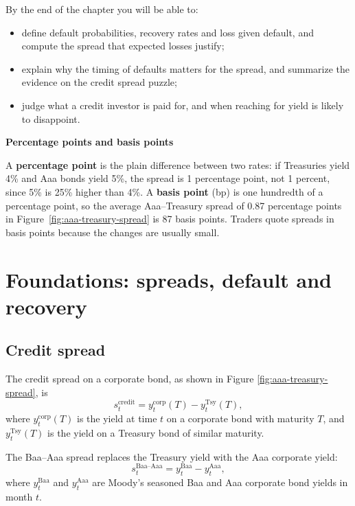 By the end of the chapter you will be able to:

\begin{itemize}
  \item define default probabilities, recovery rates and loss given default, and compute the spread that expected losses justify;
  \item explain why the timing of defaults matters for the spread, and summarize the evidence on the credit spread puzzle;
  \item judge what a credit investor is paid for, and when reaching for yield is likely to disappoint.
\end{itemize}

\begin{callout}{\textbf{Percentage points and basis points}}

A \textbf{percentage point} is the plain difference between two rates: if Treasuries yield 4\% and Aaa bonds yield 5\%, the spread is 1 percentage point, not 1 percent, since 5\% is 25\% higher than 4\%. A \textbf{basis point} (bp) is one hundredth of a percentage point, so the average Aaa--Treasury spread of 0.87 percentage points in Figure~\ref{fig:aaa-treasury-spread} is 87 basis points. Traders quote spreads in basis points because the changes are usually small.
\end{callout}

\section{Foundations: spreads, default and recovery}
\label{sec:15-foundations}

\subsection{Credit spread}

The credit spread on a corporate bond, as shown in Figure \ref{fig:aaa-treasury-spread}, is
\begin{equation}
  s_t^{\text{credit}} = y_t^{\text{corp}}(T) - y_t^{\text{Tsy}}(T),
  \label{eq:credit-spread}
\end{equation}
where $y_t^{\text{corp}}(T)$ is the yield at time $t$ on a corporate bond with maturity $T$, and $y_t^{\text{Tsy}}(T)$ is the yield on a Treasury bond of similar maturity.

The Baa--Aaa spread replaces the Treasury yield with the Aaa corporate yield:
\begin{equation}
  s_t^{\text{Baa--Aaa}} = y_t^{\text{Baa}} - y_t^{\text{Aaa}},
  \label{eq:baa-aaa-spread}
\end{equation}
where $y_t^{\text{Baa}}$ and $y_t^{\text{Aaa}}$ are Moody's seasoned Baa and Aaa corporate bond yields in month $t$.



